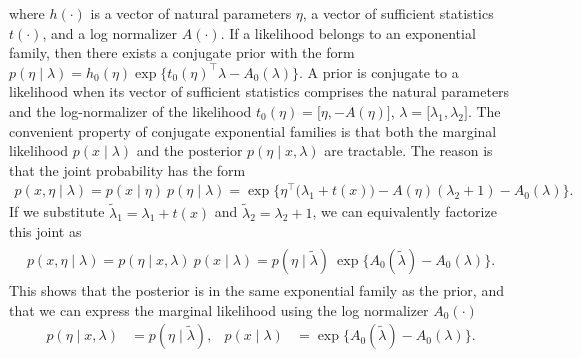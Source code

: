 \documentclass[tablecaption=bottom,wcp]{jmlr} %
\begin{document}
where $h(\cdot)$ is a vector of natural parameters $\eta$, a vector of sufficient statistics $t(\cdot)$, and a log normalizer $A(\cdot)$.
If a likelihood belongs to an exponential family, then there exists a conjugate prior with the form  $p(\eta \mid \lambda) = h_0(\eta) \exp \big\{ t_0(\eta)^\top \lambda - A_0(\lambda) \big\}$.
A prior is conjugate to a likelihood when its vector of sufficient statistics comprises the natural parameters and the log-normalizer of the likelihood $t_0(\eta) = \big[ \eta, - A(\eta) \big]$, $\lambda = \big[ \lambda_1, \lambda_2 \big]$.
The convenient property of conjugate exponential families is that both the marginal likelihood $p(x \mid \lambda)$ and the posterior $p(\eta \mid x, \lambda)$ are tractable. The reason is that the joint probability has the form
\begin{align*}
    p(x, \eta \mid \lambda) = p(x \mid \eta) \: p(\eta \mid \lambda)
    =\exp \big\{ 
      \eta^\top \! \big(\lambda_1 \!+\! t(x)\big) 
      -
      A(\eta) (\lambda_2 \!+\! 1) 
      -
      A_0(\lambda)
    \big\}.
\end{align*}
If we substitute $\tilde{\lambda}_1 = \lambda_1 + t(x)$ and $\tilde{\lambda}_2 = \lambda_2 + 1$, we can equivalently factorize this joint as
\begin{align}
    \label{eq:cef-joint}
    \begin{split}
    p(x, \eta \mid \lambda) = p(\eta \mid x, \lambda) \: p(x \mid \lambda) 
    = p(\eta \mid \tilde{\lambda}) \: \exp\big\{ A_0(\tilde{\lambda}) - A_0(\lambda) \big\}.
    \end{split}
\end{align}
This shows that the posterior is in the same exponential family as the prior, and that we can express the marginal likelihood using the log normalizer $A_0(\cdot)$
\begin{align}
    \label{eq:cef-posterior-and-marginal}
    p(\eta \mid x, \lambda) &= p(\eta \mid \tilde{\lambda}),
    &
    p(x \mid \lambda) &= \exp\big\{ A_0(\tilde{\lambda}) - A_0(\lambda) \big\}.
\end{align}
\end{document}
